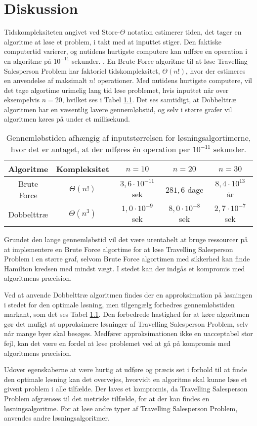 \chapter{Diskussion}

Tidskompleksiteten angivet ved Store-$\Theta$ notation estimerer tiden, det tager en algoritme at løse et problem, i takt med at inputtet stiger. 
Den faktiske computertid varierer, og nutidens hurtigste computere kan udføre en operation i en algoritme på $10^{-11}$ sekunder. \cite{dmat}.
En Brute Force algoritme til at løse Travelling Salesperson Problem har faktoriel tidskompleksitet, $\Theta(n!)$, hvor der estimeres en anvendelse af maksimalt $n!$ operationer.
Med nutidens hurtigste computere, vil det tage algortime urimelig lang tid løse problemet, hvis inputtet når over eksempelvis $n=20$, hvilket ses i Tabel \ref{tab_algtsp}. Det ses samtidigt, at Dobbelttræ algoritmen har en væsentlig lavere gennemløbstid, og selv i større grafer vil algoritmen køres på under et millisekund. 

\begin{table}[h]
 \centering
  \begin{tabular}{|c|c|c|c|c|}
   \hline
   Algoritme & Kompleksitet & $n=10$ & $n=20$ & $n=30$\\
   \hline
   Brute Force & $\Theta(n!)$ & $3,6 \cdot 10^{-11}$ sek & $281,6$ dage & $8,4 \cdot 10^{13}$ år \\
   \hline
   Dobbelttræ & $\Theta(n^3)$ & $1,0 \cdot 10^{-9}$ sek & $8,0 \cdot 10^{-8}$ sek & $2,7 \cdot 10^{-7}$ sek \\
   \hline
  \end{tabular}
 \caption{Gennemløbstiden afhængig af inputstørrelsen for løsningsalgortimerne, hvor det er antaget, at der udføres én operation per $10^{-11}$ sekunder.} \label{tab_algtsp}
\end{table}

Grundet den lange gennemløbstid vil det være urentabelt at bruge ressourcer på at implementere en Brute Force algortime for at løse Travelling Salesperson Problem i en større graf, selvom Brute Force algortimen med sikkerhed kan finde Hamilton kredsen med mindst vægt. 
I stedet kan der indgås et kompromis med algoritmens præcision. 

Ved at anvende Dobbelttræ algoritmen findes der en approksimation på løsningen i stedet for den optimale løsning, men tilgengælg forbedres gennemløbstiden markant, som det ses Tabel \ref{tab_algtsp}. 
Den forbedrede hastighed for at køre algoritmen gør det muligt at approksimere løsninger af Travelling Salesperson Problem, selv når mange byer skal besøges. 
Medfører approksimationen ikke en uacceptabel stor fejl, kan det være en  fordel at løse problemet ved at gå på kompromis med algoritmens præcision.

Udover egenskaberne at være hurtig at udføre og præcis set i forhold til at finde den optimale løsning kan det overvejes, hvorvidt en algoritme skal kunne løse et givent problem i alle tilfælde. 
Der laves et kompromis, da Travelling Salesperson Problem afgrænses til det metriske tilfælde, for at der kan findes en løsningsalgoritme. For at løse andre typer af Travelling Salesperson Problem, anvendes andre løsningsalgoritmer. 